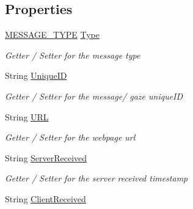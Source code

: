 \subsection*{Properties}
\begin{DoxyCompactItemize}
\item 
\hyperlink{class_web_analyzer_1_1_models_1_1_message_model_1_1_in_data_message_a5c01620a5429c5eec75477e614c96f94}{M\+E\+S\+S\+A\+G\+E\+\_\+\+T\+Y\+P\+E} \hyperlink{class_web_analyzer_1_1_models_1_1_message_model_1_1_in_data_message_a356594016758209b80a198d9839ba14b}{Type}
\begin{DoxyCompactList}\small\item\em Getter / Setter for the message type \end{DoxyCompactList}\item 
String \hyperlink{class_web_analyzer_1_1_models_1_1_message_model_1_1_in_data_message_ad46f5d3693e3dc7de2a1a94def3f6259}{Unique\+I\+D}
\begin{DoxyCompactList}\small\item\em Getter / Setter for the message/ gaze unique\+I\+D \end{DoxyCompactList}\item 
String \hyperlink{class_web_analyzer_1_1_models_1_1_message_model_1_1_in_data_message_a16e5e70d5df3ff7cf9c32793809c9beb}{U\+R\+L}
\begin{DoxyCompactList}\small\item\em Getter / Setter for the webpage url \end{DoxyCompactList}\item 
String \hyperlink{class_web_analyzer_1_1_models_1_1_message_model_1_1_in_data_message_ae6ff5467025cab4867de27d450d48c55}{Server\+Received}
\begin{DoxyCompactList}\small\item\em Getter / Setter for the server received timestamp \end{DoxyCompactList}\item 
String \hyperlink{class_web_analyzer_1_1_models_1_1_message_model_1_1_in_data_message_a85a3ae76fb0c23df0ec921708dbae75f}{Client\+Received}

\end{DoxyCompactItemize}
